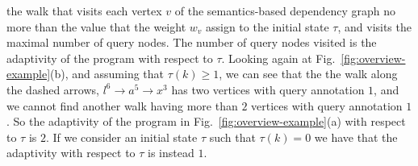 the walk  that visits each vertex $v$ of the semantics-based dependency graph no more than the value that the weight $w_v$ assign to the initial state $\tau$, and visits the maximal number of query nodes.
The number of query nodes visited is the adaptivity of the program with respect to $\tau$.
Looking again at Fig.~\ref{fig:overview-example}(b), and assuming that $\tau(k) \geq 1$, we can see that the 
the walk along the dashed arrows,  $l^{6} \to a^5 \to x^3 $ has two vertices with query annotation $1$, and we cannot find another walk having more than $2$ vertices with query annotation $1$. So the adaptivity of the program in Fig.~\ref{fig:overview-example}(a) with respect to $\tau$ is $2$. If we consider an initial state $\tau$ such that $\tau(k)=0$ we have that the adaptivity with respect to $\tau$ is instead $1$. 


